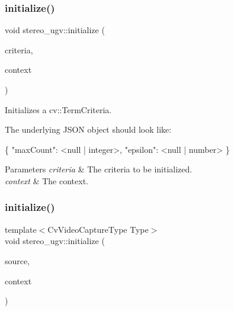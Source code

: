 \subsubsection{\texorpdfstring{initialize()}{initialize()}\hspace{0.1cm}{\footnotesize\ttfamily [5/6]}}
{\footnotesize\ttfamily void stereo\+\_\+ugv\+::initialize (\begin{DoxyParamCaption}\item[{cv\+::\+Term\+Criteria $\ast$}]{criteria,  }\item[{const \hyperlink{classstereo__ugv_1_1Context}{Context} \&}]{context }\end{DoxyParamCaption})}



Initializes a cv\+::\+Term\+Criteria. 

The underlying J\+S\+ON object should look like\+: 
\begin{DoxyCode}
\{
  \textcolor{stringliteral}{"maxCount"}: <null | integer>,
  \textcolor{stringliteral}{"epsilon"}: <null | number>
\}
\end{DoxyCode}
 
\begin{DoxyParams}{Parameters}
{\em criteria} & The criteria to be initialized. \\
\hline
{\em context} & The context. \\
\hline
\end{DoxyParams}
\mbox{\label{namespacestereo__ugv_acaec0936792769b5d676773f7d4070cd}} 
\subsubsection{\texorpdfstring{initialize()}{initialize()}\hspace{0.1cm}{\footnotesize\ttfamily [6/6]}}
{\footnotesize\ttfamily template$<$Cv\+Video\+Capture\+Type Type$>$ \\
void stereo\+\_\+ugv\+::initialize (\begin{DoxyParamCaption}\item[{\hyperlink{classstereo__ugv_1_1CvVideoCaptureImageSource}{Cv\+Video\+Capture\+Image\+Source}$<$ Type $>$ $\ast$}]{source,  }\item[{const \hyperlink{classstereo__ugv_1_1Context}{Context} \&}]{context }\end{DoxyParamCaption})\hspace{0.3cm}{\ttfamily [inline]}}



